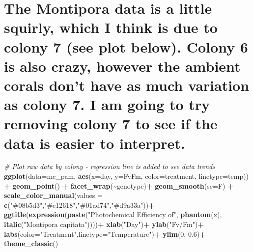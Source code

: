 \documentclass[
]{article}
\newenvironment{Shaded}{\begin{snugshade}}{\end{snugshade}}
\newcommand{\AttributeTok}[1]{\textcolor[rgb]{0.13,0.29,0.53}{#1}}
\newcommand{\CommentTok}[1]{\textcolor[rgb]{0.56,0.35,0.01}{\textit{#1}}}
\newcommand{\DecValTok}[1]{\textcolor[rgb]{0.00,0.00,0.81}{#1}}
\newcommand{\FloatTok}[1]{\textcolor[rgb]{0.00,0.00,0.81}{#1}}
\newcommand{\FunctionTok}[1]{\textcolor[rgb]{0.13,0.29,0.53}{\textbf{#1}}}
\newcommand{\NormalTok}[1]{#1}
\newcommand{\SpecialCharTok}[1]{\textcolor[rgb]{0.81,0.36,0.00}{\textbf{#1}}}
\newcommand{\StringTok}[1]{\textcolor[rgb]{0.31,0.60,0.02}{#1}}
\begin{document}
\hypertarget{the-montipora-data-is-a-little-squirly-which-i-think-is-due-to-colony-7-see-plot-below.-colony-6-is-also-crazy-however-the-ambient-corals-dont-have-as-much-variation-as-colony-7.-i-am-going-to-try-removing-colony-7-to-see-if-the-data-is-easier-to-interpret.}{%
\section{The Montipora data is a little squirly, which I think is due to
colony 7 (see plot below). Colony 6 is also crazy, however the ambient
corals don't have as much variation as colony 7. I am going to try
removing colony 7 to see if the data is easier to
interpret.}\label{the-montipora-data-is-a-little-squirly-which-i-think-is-due-to-colony-7-see-plot-below.-colony-6-is-also-crazy-however-the-ambient-corals-dont-have-as-much-variation-as-colony-7.-i-am-going-to-try-removing-colony-7-to-see-if-the-data-is-easier-to-interpret.}}

\begin{Shaded}
\begin{Highlighting}[]
\CommentTok{\# Plot raw data by colony {-} regression line is added to see data trends}
\FunctionTok{ggplot}\NormalTok{(}\AttributeTok{data=}\NormalTok{mc\_pam, }\FunctionTok{aes}\NormalTok{(}\AttributeTok{x=}\NormalTok{day, }\AttributeTok{y=}\NormalTok{FvFm, }\AttributeTok{color=}\NormalTok{treatment, }\AttributeTok{linetype=}\NormalTok{temp)) }\SpecialCharTok{+}
  \FunctionTok{geom\_point}\NormalTok{() }\SpecialCharTok{+}
  \FunctionTok{facet\_wrap}\NormalTok{(}\SpecialCharTok{\textasciitilde{}}\NormalTok{genotype)}\SpecialCharTok{+}
  \FunctionTok{geom\_smooth}\NormalTok{(}\AttributeTok{se=}\NormalTok{F) }\SpecialCharTok{+}
  \FunctionTok{scale\_color\_manual}\NormalTok{(}\AttributeTok{values =} \FunctionTok{c}\NormalTok{(}\StringTok{"\#08b5d3"}\NormalTok{,}\StringTok{"\#e12618"}\NormalTok{,}\StringTok{"\#01ad74"}\NormalTok{,}\StringTok{"\#d9a33a"}\NormalTok{))}\SpecialCharTok{+}
  \FunctionTok{ggtitle}\NormalTok{(}\FunctionTok{expression}\NormalTok{(}\FunctionTok{paste}\NormalTok{(}\StringTok{"Photochemical Efficiency of"}\NormalTok{, }\FunctionTok{phantom}\NormalTok{(x), }\FunctionTok{italic}\NormalTok{(}\StringTok{"Montipora capitata"}\NormalTok{))))}\SpecialCharTok{+}
  \FunctionTok{xlab}\NormalTok{(}\StringTok{"Day"}\NormalTok{)}\SpecialCharTok{+}
  \FunctionTok{ylab}\NormalTok{(}\StringTok{"Fv/Fm"}\NormalTok{)}\SpecialCharTok{+}
  \FunctionTok{labs}\NormalTok{(}\AttributeTok{color=}\StringTok{"Treatment"}\NormalTok{,}\AttributeTok{linetype=}\StringTok{"Temperature"}\NormalTok{)}\SpecialCharTok{+}
  \FunctionTok{ylim}\NormalTok{(}\DecValTok{0}\NormalTok{, }\FloatTok{0.6}\NormalTok{)}\SpecialCharTok{+}
  \FunctionTok{theme\_classic}\NormalTok{()}
\end{Highlighting}
\end{Shaded}
\end{document}
